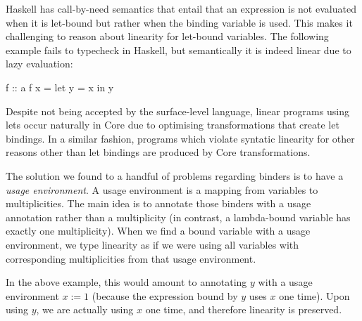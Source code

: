 \documentclass[]{lwnovathesis}
\begin{document}
Haskell has call-by-need semantics that entail that an expression is not
evaluated when it is let-bound but rather when the binding variable is used.
This makes it challenging to reason about linearity for let-bound variables. The
following example fails to typecheck in Haskell, but semantically it is indeed
linear due to lazy evaluation:

\begin{code}
f :: a %
f x = let y = x in y
\end{code}

Despite not being accepted by the surface-level language, linear programs using
lets occur naturally in Core due to optimising transformations that create let
bindings. In a similar fashion, programs which violate syntatic linearity
for other reasons other than let bindings are produced by Core transformations.

The solution we found to a handful of problems regarding binders is to have a
\emph{usage environment}. A usage environment is a mapping from variables to
multiplicities. The main idea is to annotate those binders with a usage
annotation rather than a multiplicity (in contrast, a lambda-bound variable has
exactly one multiplicity). When we find a bound variable with a usage
environment, we type linearity as if we were using all variables with
corresponding multiplicities from that usage environment.

In the above example, this would amount to annotating $y$ with a usage
environment $x := 1$ (because the expression bound by $y$ uses $x$ one time).
Upon using $y$, we are actually using $x$ one time, and therefore linearity is
preserved.



\end{document}
